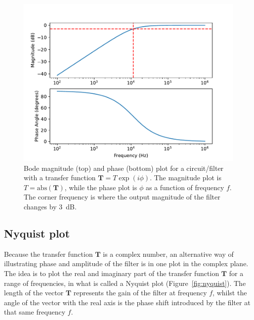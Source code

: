 \documentclass{article}
\begin{document}
\begin{figure}
  \centering
  \includegraphics[width=\columnwidth]{images/bodeplot}
  \caption{Bode magnitude (top) and phase (bottom) plot for a
    circuit/filter with a transfer function
    $\mathbf{T}= T\exp{(i\phi)}$. The magnitude plot is
    $T=\mbox{abs}(\mathbf{T})$, while the phase plot is $\phi$ as a
    function of frequency $f$. The corner frequency is where the
    output magnitude of the filter changes by 3~dB.}
  \label{fig:bode}
\end{figure}

\subsection*{Nyquist plot}
Because the transfer function $\mathbf{T}$ is a complex number, an
alternative way of illustrating phase and amplitude of the filter is
in one plot in the complex plane. The idea is to plot the real and
imaginary part of the transfer function $\mathbf{T}$ for a range of
frequencies, in what is called a Nyquist plot
(Figure~\ref{fig:nyquist}). The length of the vector $\mathbf{T}$
represents the gain of the filter at frequency $f$, whilst the angle
of the vector with the real axis is the phase shift introduced by the
filter at that same frequency $f$.
\end{document}
